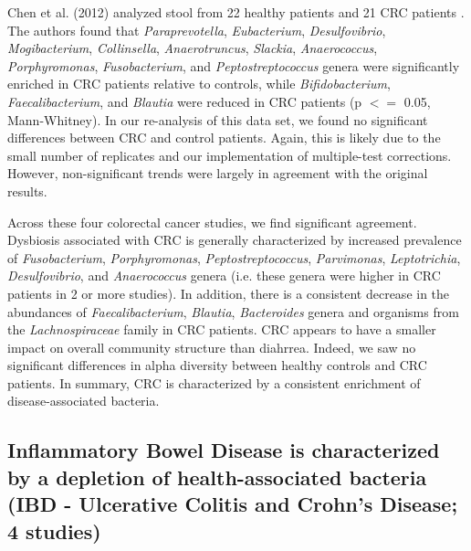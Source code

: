 \documentclass{article}
\begin{document}
{Chen et al. (2012) analyzed stool from 22 healthy patients and 21 CRC patients \cite{crc-xiang}. 
The authors found that \textit{Paraprevotella}, \textit{Eubacterium}, \textit{Desulfovibrio}, \textit{Mogibacterium}, \textit{Collinsella}, \textit{Anaerotruncus}, \textit{Slackia}, \textit{Anaerococcus}, \textit{Porphyromonas}, \textit{Fusobacterium}, and \textit{Peptostreptococcus} genera were significantly enriched in CRC patients relative to controls, while \textit{Bifidobacterium}, \textit{Faecalibacterium}, and \textit{Blautia} were reduced in CRC patients (p $<=$ 0.05, Mann-Whitney). 
In our re-analysis of this data set, we found no significant differences between CRC and control patients. 
Again, this is likely due to the small number of replicates and our implementation of multiple-test corrections. 
However, non-significant trends were largely in agreement with the original results.

Across these four colorectal cancer studies, we find significant agreement. 
Dysbiosis associated with CRC is generally characterized by increased prevalence of \textit{Fusobacterium}, \textit{Porphyromonas}, \textit{Peptostreptococcus}, \textit{Parvimonas}, \textit{Leptotrichia}, \textit{Desulfovibrio}, and \textit{Anaerococcus} genera (i.e. these genera were higher in CRC patients in 2 or more studies). 
In addition, there is a consistent decrease in the abundances of \textit{Faecalibacterium}, \textit{Blautia}, \textit{Bacteroides} genera and organisms from the \textit{Lachnospiraceae} family in CRC patients. 
CRC appears to have a smaller impact on overall community structure than diahrrea. 
Indeed, we saw no significant differences in alpha diversity between healthy controls and CRC patients. 
In summary, CRC is characterized by a consistent enrichment of disease-associated bacteria.

\subsection*{Inflammatory Bowel Disease is characterized by a depletion of health-associated bacteria (IBD - Ulcerative Colitis and Crohn's Disease; 4 studies)}

}
\end{document}
